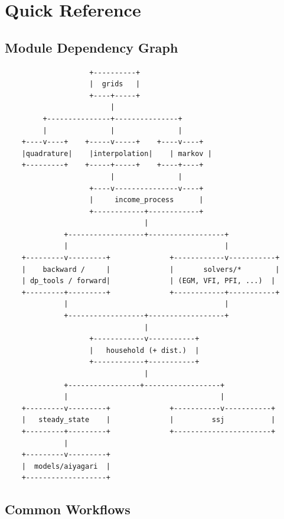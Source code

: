 \documentclass[12pt]{book}
\begin{document}
\chapter{Quick Reference}

\section{Module Dependency Graph}

\begin{verbatim}
                    +----------+
                    |  grids   |
                    +----+-----+
                         |
         +---------------+---------------+
         |               |               |
    +----v----+    +-----v-----+    +----v----+
    |quadrature|    |interpolation|    | markov |
    +---------+    +-----+-----+    +----+----+
                         |               |
                    +----v---------------v----+
                    |     income_process      |
                    +------------+------------+
                                 |
              +------------------+------------------+
              |                                     |
    +---------v---------+              +------------v-----------+
    |    backward /     |              |       solvers/*        |
    | dp_tools / forward|              | (EGM, VFI, PFI, ...)  |
    +---------+---------+              +------------+-----------+
              |                                     |
              +------------------+------------------+
                                 |
                    +------------v-----------+
                    |   household (+ dist.)  |
                    +------------+-----------+
                                 |
              +-----------------+------------------+
              |                                    |
    +---------v---------+              +-----------v-----------+
    |   steady_state    |              |         ssj           |
    +---------+---------+              +-----------------------+
              |
    +---------v---------+
    |  models/aiyagari  |
    +-------------------+
\end{verbatim}

\section{Common Workflows}
\end{document}
